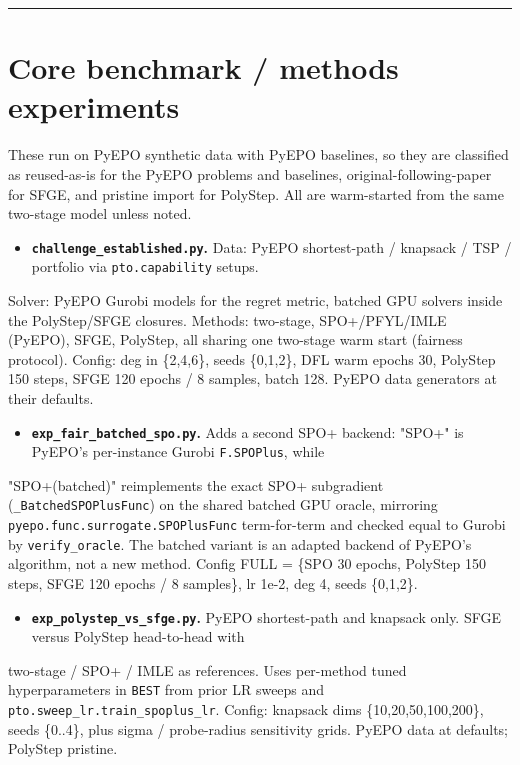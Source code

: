 \documentclass[10pt]{article}
\begin{document}
\medskip\hrule\medskip

\section*{Core benchmark / methods experiments}

These run on PyEPO synthetic data with PyEPO baselines, so they are classified as reused-as-is for the PyEPO problems
and baselines, original-following-paper for SFGE, and pristine import for PolyStep. All are warm-started from the same
two-stage model unless noted.

\begin{itemize}\setlength{\itemsep}{2pt}
\item \textbf{\texttt{challenge\_established.py}.} Data: PyEPO shortest-path / knapsack / TSP / portfolio via \texttt{pto.capability} setups.
\end{itemize}
  Solver: PyEPO Gurobi models for the regret metric, batched GPU solvers inside the PolyStep/SFGE closures. Methods:
  two-stage, SPO+/PFYL/IMLE (PyEPO), SFGE, PolyStep, all sharing one two-stage warm start (fairness protocol). Config:
  deg in \{2,4,6\}, seeds \{0,1,2\}, DFL warm epochs 30, PolyStep 150 steps, SFGE 120 epochs / 8 samples, batch 128. PyEPO
  data generators at their defaults.

\begin{itemize}\setlength{\itemsep}{2pt}
\item \textbf{\texttt{exp\_fair\_batched\_spo.py}.} Adds a second SPO+ backend: "SPO+" is PyEPO's per-instance Gurobi \texttt{F.SPOPlus}, while
\end{itemize}
  "SPO+(batched)" reimplements the exact SPO+ subgradient (\texttt{\_BatchedSPOPlusFunc}) on the shared batched GPU oracle,
  mirroring \texttt{pyepo.func.surrogate.SPOPlusFunc} term-for-term and checked equal to Gurobi by \texttt{verify\_oracle}. The batched
  variant is an adapted backend of PyEPO's algorithm, not a new method. Config FULL = \{SPO 30 epochs, PolyStep 150
  steps, SFGE 120 epochs / 8 samples\}, lr 1e-2, deg 4, seeds \{0,1,2\}.

\begin{itemize}\setlength{\itemsep}{2pt}
\item \textbf{\texttt{exp\_polystep\_vs\_sfge.py}.} PyEPO shortest-path and knapsack only. SFGE versus PolyStep head-to-head with
\end{itemize}
  two-stage / SPO+ / IMLE as references. Uses per-method tuned hyperparameters in \texttt{BEST} from prior LR sweeps and
  \texttt{pto.sweep\_lr.train\_spoplus\_lr}. Config: knapsack dims \{10,20,50,100,200\}, seeds \{0..4\}, plus sigma / probe-radius
  sensitivity grids. PyEPO data at defaults; PolyStep pristine.
\end{document}
